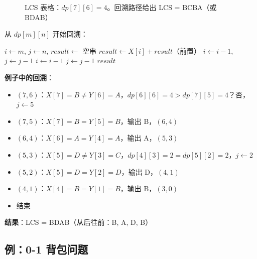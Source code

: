 \documentclass[12pt, a4paper]{ctexart}
\begin{document}
\begin{figure}[ht]
\caption{LCS 表格：$dp[7][6] = 4$。回溯路径给出 LCS = BCBA（或 BDAB）}
\end{figure}

\begin{blackboard}

从 $dp[m][n]$ 开始回溯：

\begin{algorithmic}[1]
\STATE $i \gets m$, $j \gets n$, $result \gets$ 空串
        \STATE $result \gets X[i] + result$（前置）
        \STATE $i \gets i - 1$, $j \gets j - 1$
        \STATE $i \gets i - 1$
    \ELSE
        \STATE $j \gets j - 1$
    \ENDIF
\ENDWHILE
\RETURN $result$
\end{algorithmic}

\textbf{例子中的回溯}：
\begin{itemize}
    \item $(7,6)$：$X[7]=B \neq Y[6]=A$，$dp[6][6]=4 > dp[7][5]=4$？否，$j \gets 5$
    \item $(7,5)$：$X[7]=B = Y[5]=B$，输出 B，$(6,4)$
    \item $(6,4)$：$X[6]=A = Y[4]=A$，输出 A，$(5,3)$
    \item $(5,3)$：$X[5]=D \neq Y[3]=C$，$dp[4][3]=2 = dp[5][2]=2$，$j \gets 2$
    \item $(5,2)$：$X[5]=D = Y[2]=D$，输出 D，$(4,1)$
    \item $(4,1)$：$X[4]=B = Y[1]=B$，输出 B，$(3,0)$
    \item 结束
\end{itemize}

\textbf{结果}：LCS = BDAB（从后往前：B, A, D, B）

\end{blackboard}

\subsection{例：0-1 背包问题}
\end{document}
